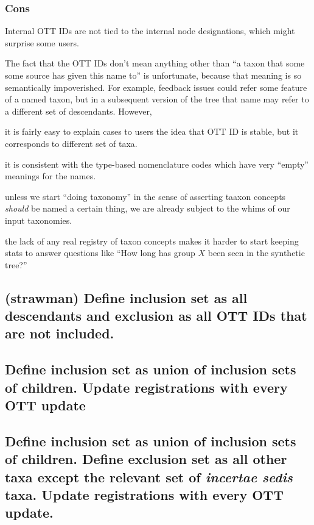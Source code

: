 \documentclass[11pt]{article}
\begin{document}
\subsubsection{Cons}
\begin{compactenum}
  \item Internal OTT IDs are not tied to the internal node designations, which might surprise
  some users.
  \item The fact that the OTT IDs don't mean anything other than ``a taxon that some
  some source has given this name to'' is unfortunate, because that meaning is so 
  semantically impoverished.
  For example, feedback issues could refer some feature of a named taxon, but in 
    a subsequent version of the tree that name may refer to a different set of 
    descendants.
  However,
  \begin{compactenum}
    \item it is fairly easy to explain cases to users the idea that OTT ID is stable,
    but it corresponds to different set of taxa.
    \item it is consistent with the type-based nomenclature codes which have
    very ``empty'' meanings for the names.
    \item unless we start ``doing taxonomy'' in the sense of asserting taaxon concepts
    {\em should} be named a certain thing, we are already subject to the whims
    of our input taxonomies.
  \end{compactenum}
  \item the lack of any real registry of taxon concepts makes it harder to
  start keeping stats to answer questions like ``How long has group $X$ been
  seen in the synthetic tree?''
\end{compactenum}

\subsection{(strawman) Define inclusion set as all descendants and exclusion as all 
OTT IDs that are not included.}

\subsection{Define inclusion set as union of inclusion sets of children.
Update registrations with every OTT update}

\subsection{Define inclusion set as union of inclusion sets of children. Define 
exclusion set as all other taxa except the relevant set of {\em incertae sedis} 
taxa.
Update registrations with every OTT update.}
\end{document}
